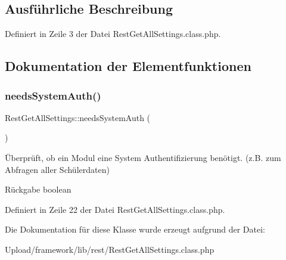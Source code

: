 \subsection{Ausführliche Beschreibung}


Definiert in Zeile 3 der Datei Rest\+Get\+All\+Settings.\+class.\+php.



\subsection{Dokumentation der Elementfunktionen}
\mbox{\label{class_rest_get_all_settings_aa3c4e9f83a034fdce78811955a342bc3}} 
\subsubsection{\texorpdfstring{needs\+System\+Auth()}{needsSystemAuth()}}
{\footnotesize\ttfamily Rest\+Get\+All\+Settings\+::needs\+System\+Auth (\begin{DoxyParamCaption}{ }\end{DoxyParamCaption})}

Überprüft, ob ein Modul eine System Authentifizierung benötigt. (z.\+B. zum Abfragen aller Schülerdaten) \begin{DoxyReturn}{Rückgabe}
boolean 
\end{DoxyReturn}


Definiert in Zeile 22 der Datei Rest\+Get\+All\+Settings.\+class.\+php.



Die Dokumentation für diese Klasse wurde erzeugt aufgrund der Datei\+:\begin{DoxyCompactItemize}
\item 
Upload/framework/lib/rest/Rest\+Get\+All\+Settings.\+class.\+php\end{DoxyCompactItemize}
